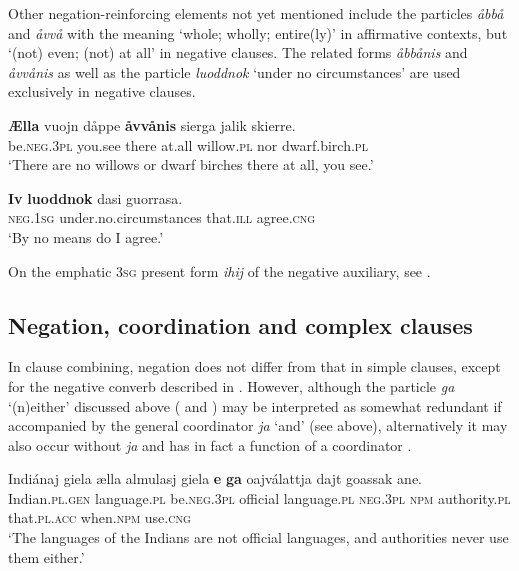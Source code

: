 \documentclass[output=paper,colorlinks,citecolor=brown]{langscibook}
\begin{document}
Other negation-reinforcing elements not yet mentioned include the particles \textit{åbbå} and \textit{åvvå} with the meaning ‘whole; wholly; entire(ly)’ in affirmative contexts, but ‘(not) even; (not) at all’ in negative clauses. The related forms \textit{åbbånis} and \textit{åvvånis}  as well as the particle \textit{luoddnok} ‘under no circumstances’  are used exclusively in negative clauses.

\ea\label{ex:lul:54} 
    \gll \textbf{Ælla} vuojn dåppe \textbf{åvvånis} sierga jalik skierre. \\ 
         be.\textsc{neg.3pl} you.see there at.all willow.\textsc{pl} nor dwarf.birch.\textsc{pl} \\
    \glt ‘There are no willows or dwarf birches there at all, you see.’ \citep{SIKOR2021}
\z 

\ea\label{ex:lul:55} 
    \gll \textbf{Iv} \textbf{luoddnok} dasi guorrasa. \\ 
          \textsc{neg.1sg} under.no.circumstances that\textsc{.ill} agree.\textsc{cng} \\
    \glt  ‘By no means do I agree.’ \citep{SIKOR2021}
\z 

On the emphatic \textsc{3sg} present form \textit{ihij} of the negative auxiliary, see .

\subsection{Negation, coordination and complex clauses} \label{sec:lul:4.5}

In clause combining, negation does not differ from that in simple clauses, except for the negative converb described in . However, although the particle \textit{ga} ‘(n)either’ discussed above ( and ) may be interpreted as somewhat redundant if accompanied by the general coordinator \textit{ja} ‘and’ (see  above), alternatively it may also occur without \textit{ja} and has in fact a function of a coordinator .

\ea\label{ex:lul:56} 
    \gll Indiánaj giela ælla almulasj giela \textbf{e} \textbf{ga} oajválattja dajt goassak ane.\\ 
          Indian.\textsc{pl.gen} language.\textsc{pl} be.\textsc{neg.3pl} official language.\textsc{pl} \textsc{neg.3pl} \textsc{npm} authority.\textsc{pl} that\textsc{.pl.acc} when.\textsc{npm} use.\textsc{cng}\\
    \glt ‘The languages of the Indians are not official languages, and authorities never use them either.’ \citep{SIKOR2021}
\z 
\end{document}
